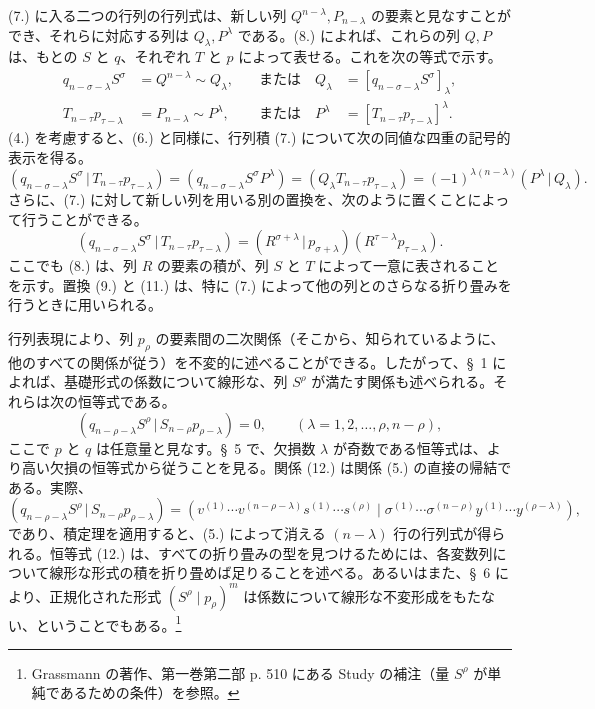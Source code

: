 \documentclass[11pt]{jlreq}
\newcommand{\pair}[2]{(#1\,|\,#2)}
\begin{document}
(7.) に入る二つの行列の行列式は、新しい列 $Q^{n-\lambda},P_{n-\lambda}$ の要素と見なすことができ、それらに対応する列は $Q_\lambda,P^\lambda$ である。(8.) によれば、これらの列 $Q,P$ は、もとの $S$ と $q$、それぞれ $T$ と $p$ によって表せる。これを次の等式で示す。
\begin{equation}
\begin{aligned}
 q_{n-\sigma-\lambda}S^\sigma&=Q^{n-\lambda}\sim Q_\lambda, &\quad\text{または}\quad Q_\lambda&=[q_{n-\sigma-\lambda}S^\sigma]_\lambda,\\
 T_{n-\tau}p_{\tau-\lambda}&=P_{n-\lambda}\sim P^\lambda, &\quad\text{または}\quad P^\lambda&=[T_{n-\tau}p_{\tau-\lambda}]^\lambda.
\end{aligned}
\tag{9}
\end{equation}
(4.) を考慮すると、(6.) と同様に、行列積 (7.) について次の同値な四重の記号的表示を得る。
\begin{equation}
\pair{q_{n-\sigma-\lambda}S^\sigma}{T_{n-\tau}p_{\tau-\lambda}}
=(q_{n-\sigma-\lambda}S^\sigma P^\lambda)=(Q_\lambda T_{n-\tau}p_{\tau-\lambda})=(-1)^{\lambda(n-\lambda)}\pair{P^\lambda}{Q_\lambda}.
\tag{10}
\end{equation}
さらに、(7.) に対して新しい列を用いる別の置換を、次のように置くことによって行うことができる。
\begin{equation}
 \pair{q_{n-\sigma-\lambda}S^\sigma}{T_{n-\tau}p_{\tau-\lambda}}
 =\pair{R^{\sigma+\lambda}}{p_{\sigma+\lambda}}(R^{\tau-\lambda}p_{\tau-\lambda}).
\tag{11}
\end{equation}
ここでも (8.) は、列 $R$ の要素の積が、列 $S$ と $T$ によって一意に表されることを示す。置換 (9.) と (11.) は、特に (7.) によって他の列とのさらなる折り畳みを行うときに用いられる。

行列表現により、列 $p_\rho$ の要素間の二次関係（そこから、知られているように、他のすべての関係が従う）を不変的に述べることができる。したがって、\S\ 1 によれば、基礎形式の係数について線形な、列 $S^\rho$ が満たす関係も述べられる。それらは次の恒等式である。
\begin{equation}
 \pair{q_{n-\rho-\lambda}S^\rho}{S_{n-\rho}p_{\rho-\lambda}}=0,
 \qquad (\lambda=1,2,\ldots,\rho,n-\rho),
\tag{12}
\end{equation}
ここで $p$ と $q$ は任意量と見なす。\S\ 5 で、欠損数 $\lambda$ が奇数である恒等式は、より高い欠損の恒等式から従うことを見る。関係 (12.) は関係 (5.) の直接の帰結である。実際、
\[
 \pair{q_{n-\rho-\lambda}S^\rho}{S_{n-\rho}p_{\rho-\lambda}}
 =(v^{(1)}\cdots v^{(n-\rho-\lambda)}s^{(1)}\cdots s^{(\rho)}\mid \sigma^{(1)}\cdots\sigma^{(n-\rho)}y^{(1)}\cdots y^{(\rho-\lambda)}),
\]
であり、積定理を適用すると、(5.) によって消える $(n-\lambda)$ 行の行列式が得られる。恒等式 (12.) は、すべての折り畳みの型を見つけるためには、各変数列について線形な形式の積を折り畳めば足りることを述べる。あるいはまた、\S\ 6 により、正規化された形式 $(S^\rho\mid p_\rho)^m$ は係数について線形な不変形成をもたない、ということでもある。\footnote{Grassmann の著作、第一巻第二部 p. 510 にある Study の補注（量 $S^\rho$ が単純であるための条件）を参照。}
\end{document}
